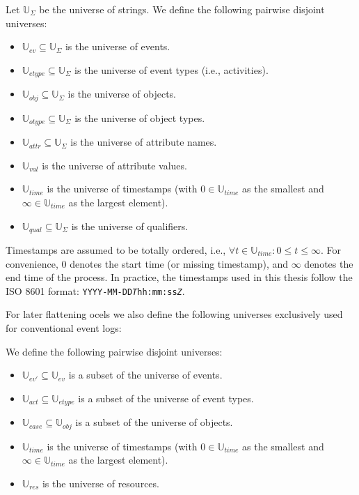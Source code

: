 \begin{definition}\label{def:ocel-universes}
Let $\mathbb{U}_\Sigma$ be the universe of strings. We define the following pairwise disjoint universes:
\begin{itemize}
  \item $\mathbb{U}_{ev} \subseteq \mathbb{U}_\Sigma$ is the universe of events.
  \item $\mathbb{U}_{etype} \subseteq \mathbb{U}_\Sigma$ is the universe of event types (i.e., activities).
  \item $\mathbb{U}_{obj} \subseteq \mathbb{U}_\Sigma$ is the universe of objects.
  \item $\mathbb{U}_{otype} \subseteq \mathbb{U}_\Sigma$ is the universe of object types.
  \item $\mathbb{U}_{attr} \subseteq \mathbb{U}_\Sigma$ is the universe of attribute names.
  \item $\mathbb{U}_{val}$ is the universe of attribute values.
  \item $\mathbb{U}_{time}$ is the universe of timestamps (with $0 \in \mathbb{U}_{time}$ as the smallest and $\infty \in \mathbb{U}_{time}$ as the largest element).
  \item $\mathbb{U}_{qual} \subseteq \mathbb{U}_\Sigma$ is the universe of qualifiers.
\end{itemize}

Timestamps are assumed to be totally ordered, i.e., $\forall t \in \mathbb{U}_{time} : 0 \leq t \leq \infty$. For convenience, $0$ denotes the start time (or missing timestamp), and $\infty$ denotes the end time of the process. In practice, the timestamps used in this thesis follow the ISO 8601 format: \texttt{YYYY-MM-DD\textit{T}hh:mm:ss\textit{Z}}.
\end{definition}

For later flattening \acp{ocel} we also define the following universes exclusively used for conventional event logs:

\begin{definition}\label{def:xes-universes}
We define the following pairwise disjoint universes:
	\begin{itemize}
		\item $\mathbb{U}_{ev'} \subseteq \mathbb{U}_{ev}$ is a subset of the universe of events.
		\item $\mathbb{U}_{act} \subseteq \mathbb{U}_{etype}$ is a subset of the universe of event types.
		\item $\mathbb{U}_{case} \subseteq \mathbb{U}_{obj}$ is a subset of the universe of objects.
		\item $\mathbb{U}_{time}$ is the universe of timestamps (with $0 \in \mathbb{U}_{time}$ as the smallest and $\infty \in \mathbb{U}_{time}$ as the largest element).
		\item $\mathbb{U}_{res}$ is the universe of resources. %
	\end{itemize}
\end{definition}

